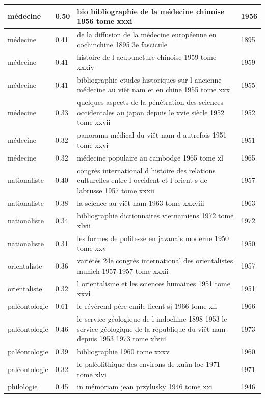 \begin{longtable}{|p{3cm}|p{1cm}|p{10cm}|p{1cm}|}
médecine & 0.50 & bio bibliographie de la médecine chinoise 1956 tome xxxi & 1956  \\ \hline
médecine & 0.41 & de la diffusion de la médecine européenne en cochinchine 1895 3e fascicule & 1895  \\ \hline
médecine & 0.41 & histoire de l acupuncture chinoise 1959 tome xxxiv & 1959  \\ \hline
médecine & 0.41 & bibliographie etudes historiques sur l ancienne médecine au viêt nam et en chine 1955 tome xxx & 1955  \\ \hline
médecine & 0.33 & quelques aspects de la pénétration des sciences occidentales au japon depuis le xvie siècle 1952 tome xxvii & 1952  \\ \hline
médecine & 0.32 & panorama médical du viêt nam d autrefois 1951 tome xxvi & 1951  \\ \hline
médecine & 0.32 & médecine populaire au cambodge 1965 tome xl & 1965  \\ \hline
nationaliste & 0.40 & congrès international d histoire des relations culturelles entre l occident et l orient s de labrusse 1957 tome xxxii & 1957  \\ \hline
nationaliste & 0.38 & la science au viêt nam 1963 tome xxxviii & 1963  \\ \hline
nationaliste & 0.34 & bibliographie dictionnaires vietnamiens 1972 tome xlvii & 1972  \\ \hline
nationaliste & 0.31 & les formes de politesse en javanais moderne 1950 tome xxv & 1950  \\ \hline
orientaliste & 0.36 & variétés 24e congrès international des orientalistes munich 1957 1957 tome xxxii & 1957  \\ \hline
orientaliste & 0.32 & l orientalisme et les sciences humaines 1951 tome xxvi & 1951  \\ \hline
paléontologie & 0.61 & le révérend père emile licent sj 1966 tome xli & 1966  \\ \hline
paléontologie & 0.46 & le service géologique de l indochine 1898 1953 le service géologique de la république du viêt nam depuis 1953 1973 tome xlviii & 1973  \\ \hline
paléontologie & 0.39 & bibliographie 1960 tome xxxv & 1960  \\ \hline
paléontologie & 0.32 & le paléolithique des environs de xuân loc 1971 tome xlvi & 1971  \\ \hline
philologie & 0.45 & in mémoriam jean przylusky 1946 tome xxi & 1946  \\ \hline

\end{longtable}
